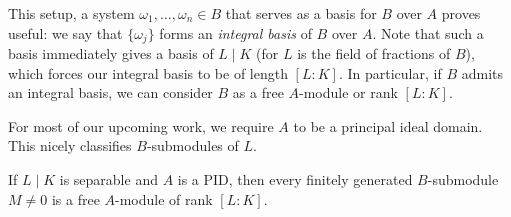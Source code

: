 This setup, a system $\omega_1,\dots,\omega_n\in B$ that serves as a basis for $B$ over $A$ proves useful: we say that $\{\omega_j\}$ forms an \emph{integral basis} of $B$ over $A$. Note that such a basis immediately gives a basis of $L\mid K$ (for $L$ is the field of fractions of $B$), which forces our integral basis to be of length $[L:K]$. In particular, if $B$ admits an integral basis, we can consider $B$ as a free $A$-module or rank $[L:K]$.

For most of our upcoming work, we require $A$ to be a principal ideal domain. This nicely classifies $B$-submodules of $L$.

\begin{prop}
	If $L\mid K$ is separable and $A$ is a PID, then every finitely generated $B$-submodule $M\neq 0$ is a free $A$-module of rank $[L:K]$.
\end{prop}
